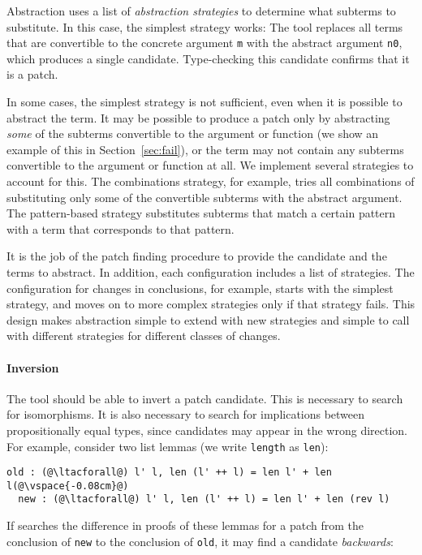 Abstraction uses a list of \textit{abstraction strategies} to determine what subterms
to substitute. In this case, the simplest strategy works: The tool
replaces all terms that are convertible to the concrete argument \lstinline{m} with the abstract argument
\lstinline{n0}, which produces a single candidate. Type-checking this candidate confirms that it is a patch.

In some cases, the simplest strategy is not sufficient, even when it is possible to abstract the term.
It may be possible to produce a patch only by abstracting \emph{some} of the subterms
convertible to the argument or function (we show an example of this in Section~\ref{sec:fail}),
or the term may not contain any subterms convertible to the argument or function at all.
We implement several strategies to account for this. The combinations strategy, for example,
tries all combinations of substituting only some of the convertible subterms with the abstract argument. 
The pattern-based strategy substitutes subterms that match a certain pattern
with a term that corresponds to that pattern.

It is the job of the patch finding procedure to provide the candidate and the terms to abstract.
In addition, each configuration includes a list of strategies.
The configuration for changes in conclusions, for example, starts with the simplest strategy,
and moves on to more complex strategies only if that strategy fails.
This design makes abstraction simple to extend with new strategies and simple to call with different strategies
for different classes of changes.

\paragraph{Inversion} The tool should be able to invert a patch candidate.
This is necessary to search for isomorphisms.
It is also necessary to search for implications between propositionally
equal types, since candidates may appear in the wrong direction.
For example, consider two list lemmas (we write \lstinline{length} as \lstinline{len}):

\begin{lstlisting}[language=coq]
  old : (@\ltacforall@) l' l, len (l' ++ l) = len l' + len l(@\vspace{-0.08cm}@)
  new : (@\ltacforall@) l' l, len (l' ++ l) = len l' + len (rev l)
\end{lstlisting} 

If \sysname searches the difference in proofs of these lemmas for a patch from the 
conclusion of \lstinline{new} to the conclusion of \lstinline{old},
it may find a candidate \emph{backwards}:


